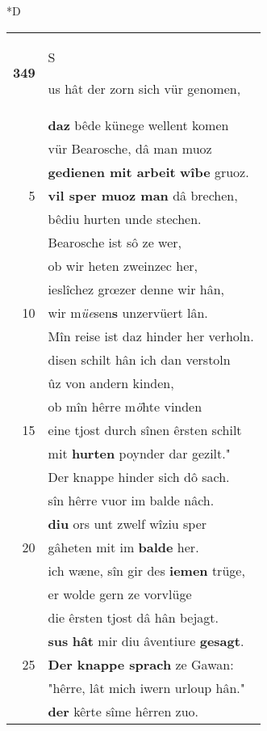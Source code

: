 \documentclass[8pt,a4paper,notitlepage]{article}
\begin{document}
\begin{table}[ht]
\begin{minipage}[t]{0.5\linewidth}
\small
\begin{center}*D
\end{center}
\begin{tabular}{rl}
\textbf{349} & \begin{large}S\end{large}us hât der zorn sich vür genomen,\\ 
 & \textbf{daz} bêde künege wellent komen\\ 
 & vür Bearosche, dâ man muoz\\ 
 & \textbf{gedienen mit arbeit} \textbf{wîbe} gruoz.\\ 
5 & \textbf{vil sper muoz man} dâ brechen,\\ 
 & bêdiu hurten unde stechen.\\ 
 & Bearosche ist sô ze wer,\\ 
 & ob wir heten zweinzec her,\\ 
 & ieslîchez grœzer denne wir hân,\\ 
10 & wir m\textit{üe}sen\textbf{s} unzervüert lân.\\ 
 & Mîn reise ist daz hinder her verholn.\\ 
 & disen schilt hân ich dan verstoln\\ 
 & ûz von andern kinden,\\ 
 & ob mîn hêrre m\textit{ö}hte vinden\\ 
15 & eine tjost durch sînen êrsten schilt\\ 
 & mit \textbf{hurten} poynder dar gezilt."\\ 
 & Der knappe hinder sich dô sach.\\ 
 & sîn hêrre vuor im balde nâch.\\ 
 & \textbf{diu} ors unt zwelf wîziu sper\\ 
20 & gâheten mit im \textbf{balde} her.\\ 
 & ich wæne, sîn gir des \textbf{iemen} trüge,\\ 
 & er wolde gern ze vorvlüge\\ 
 & die êrsten tjost dâ hân bejagt.\\ 
 & \textbf{sus} \textbf{hât} mir diu âventiure \textbf{gesagt}.\\ 
25 & \textbf{Der knappe sprach} ze Gawan:\\ 
 & "hêrre, lât mich iwern urloup hân."\\ 
 & \textbf{der} kêrte sîme hêrren zuo.\\ 

\end{tabular}
\end{minipage}
\end{table}
\end{document}
